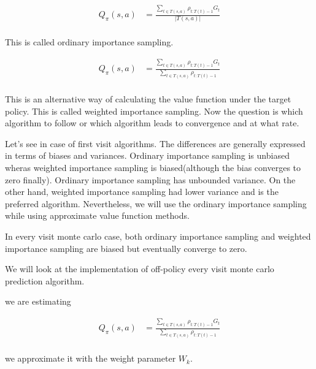 \documentclass[../main.tex]{subfiles}
\begin{document}
\begin{equation}
    \begin{aligned}
    Q_\pi(s,a) &= \frac{\sum_{t \in T(s,a) } \rho_{t:T(t)-1}G_t}{|T(s,a)|} \nonumber\\
    \end{aligned}
\end{equation}

This is called ordinary importance sampling.

\begin{equation}
    \begin{aligned}
    Q_\pi(s,a) &= \frac{\sum_{t \in T(s,a) } \rho_{t:T(t)-1}G_t}{\sum_{t \in T(s,a) } \rho_{t:T(t)-1}} \nonumber\\
    \end{aligned}
\end{equation}

This is an alternative way of calculating the value function under the target policy. This is called weighted importance sampling.
Now the question is which algorithm to follow or which algorithm leads to convergence and at what rate. 

Let's see in case of first visit algorithms. The differences are generally expressed in terms of biases and variances. Ordinary importance sampling is unbiased  wheras weighted importance sampling is biased(although the bias converges to zero finally). Ordinary importance sampling has unbounded variance. On the other hand, weighted importance sampling had lower variance and is the preferred algorithm. Nevertheless, we will use the ordinary importance sampling while using approximate value function methods.

In every visit monte carlo case, both ordinary importance sampling and weighted importance sampling are biased but eventually converge to zero.

We will look at the implementation of off-policy every visit monte carlo prediction algorithm.

we are estimating 

\begin{equation}
    \begin{aligned}
    Q_\pi(s,a) &= \frac{\sum_{t \in T(s,a) } \rho_{t:T(t)-1}G_t}{\sum_{t \in T(s,a) } \rho_{t:T(t)-1}} \nonumber\\
    \end{aligned}
\end{equation}

we approximate it with the weight parameter $W_k$.
\end{document}
